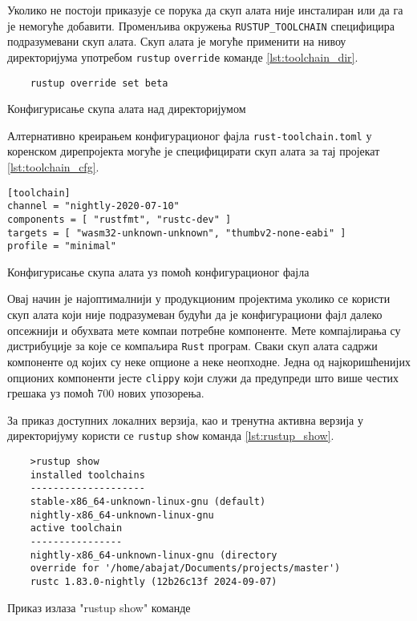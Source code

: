 Уколико не постоји приказује се порука да скуп 
алата није инсталиран или да га је немогуће добавити. Променљива окружења \verb|RUSTUP_TOOLCHAIN| специфицира 
подразумевани скуп алата. Скуп алата је могуће применити на нивоу директоријума употребом \verb|rustup| \verb|override|
команде \ref{lst:toolchain_dir}. 

\begin{listing}[H]
\begin{verbatim}
    rustup override set beta 
\end{verbatim}
\caption{Конфигурисање скупа алата над директоријумом}
\label{lst:toolchain_dir}
\end{listing}

Алтернативно креирањем конфигурационог фајла \verb|rust-toolchain.toml| у коренском 
дире пројекта могуће је специфицирати скуп алата за тај пројекат \ref{lst:toolchain_cfg}.

\begin{listing}[H]
\begin{verbatim}
[toolchain]
channel = "nightly-2020-07-10"
components = [ "rustfmt", "rustc-dev" ]
targets = [ "wasm32-unknown-unknown", "thumbv2-none-eabi" ]
profile = "minimal"
\end{verbatim}
\caption{Конфигурисање скупа алата уз помоћ конфигурационог фајла}
\label{lst:toolchain_cfg}
\end{listing}

Овај начин је најоптималнији у продукционим пројектима уколико се користи скуп алата који 
није подразумеван будући да је конфигурациони фајл далеко опсежнији и обухвата мете компа и 
потребне компоненте. Мете компајлирања су дистрибуције за које се компаљира \verb|Rust| програм.
Сваки скуп алата садржи компоненте од којих су неке опционе а неке неопходне. Једна од најкоришћенијих 
опционих компоненти јесте \verb|clippy| који служи да предупреди што више честих грешака уз помоћ 
700 нових упозорења. 


За приказ доступних локалних верзија, као и тренутна активна верзија у директоријуму користи се \verb|rustup|
\verb|show| команда \ref{lst:rustup_show}.

\begin{listing}[H]
\begin{verbatim}
    >rustup show
    installed toolchains
    --------------------
    stable-x86_64-unknown-linux-gnu (default)
    nightly-x86_64-unknown-linux-gnu
    active toolchain
    ----------------
    nightly-x86_64-unknown-linux-gnu (directory 
    override for '/home/abajat/Documents/projects/master')
    rustc 1.83.0-nightly (12b26c13f 2024-09-07)
\end{verbatim}
\caption{Приказ излаза "rustup show" команде}
\label{lst:rustup_show}
\end{listing}

